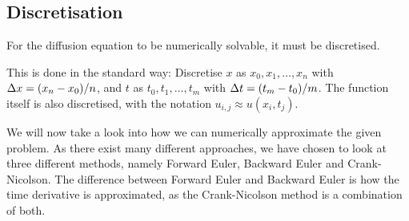 \subsection{Discretisation}


For the diffusion equation to be numerically solvable, it must be discretised.

This is done in the standard way: Discretise \(x\) as \(x_0,x_1,\dots,x_n\) with \(\Delta x=\qty(x_n-x_0)/n\), and \(t\) as \(t_0,t_1,\dots,t_m\) with \(\Delta t = \qty(t_m-t_0)/m\). The function itself is also discretised, with the notation \(u_{i,j} \approx u(x_i,t_j)\).

We will now take a look into how we can numerically approximate the given problem. As there exist many different approaches, we have chosen to look at three different methods, namely Forward Euler, Backward Euler and Crank-Nicolson. The difference between Forward Euler and Backward Euler is how the time derivative is approximated, as the Crank-Nicolson method is a combination of both.
